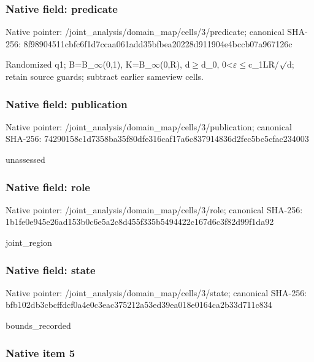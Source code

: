 \documentclass[10pt,a4paper]{article}
\begin{document}
\subsubsection{Native field: predicate}


Native pointer: /joint\_analysis/domain\_m\allowbreak{}ap/cells/3/predicate; canonical SHA-256: 8f98904511cbfc6f1d7ccaa0\allowbreak{}61add35bfbea20228d911904\allowbreak{}e4bccb07a967126c


Randomized q1; B=B\_\ensuremath{\infty}(0,1), K=B\_\ensuremath{\infty}(0,R), d\ensuremath{\ge}d\_0, 0<\ensuremath{\varepsilon}\ensuremath{\le}c\_1LR/\ensuremath{\sqrt{\vphantom{x}}}d; retain source guards; subtract earlier sameview cells.


\subsubsection{Native field: publication}


Native pointer: /joint\_analysis/domain\_m\allowbreak{}ap/cells/3/publication; canonical SHA-256: 74290158c1d7358ba35f80df\allowbreak{}e316caf17a6c837914836d2f\allowbreak{}ec5bc5cfac234003


unassessed


\subsubsection{Native field: role}


Native pointer: /joint\_analysis/domain\_map/cells/3/role; canonical SHA-256: 1b1fe0e945e26ad153b0c6e5\allowbreak{}a2c8d455f335b5494422c167\allowbreak{}d6c3f82d99f1da92


joint\_region


\subsubsection{Native field: state}


Native pointer: /joint\_analysis/domain\_m\allowbreak{}ap/cells/3/state; canonical SHA-256: bfb102db3cbcffdcf0a4e0c3\allowbreak{}eac375212a53ed39ea018e01\allowbreak{}64ca2b33d711c834


bounds\_recorded


\subsubsection{Native item 5}
\end{document}
